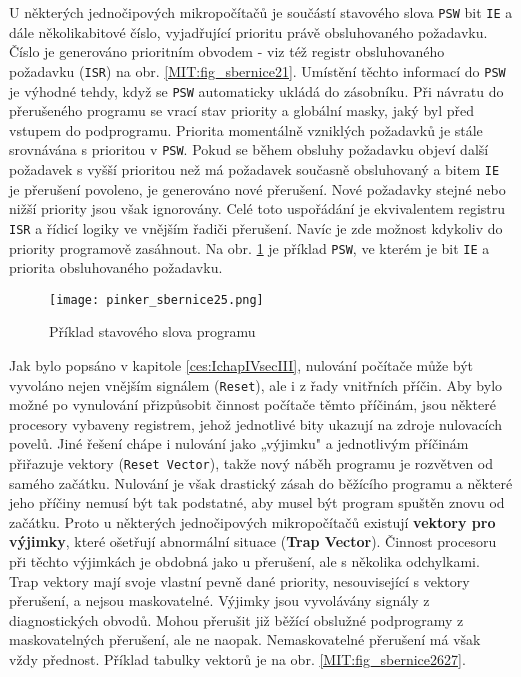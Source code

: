       U některých jednočipových mikropočítačů je součástí stavového slova \texttt{PSW} bit 
      \texttt{IE} a dále 	několikabitové číslo, vyjadřující prioritu právě obsluhovaného 
      požadavku. Číslo je generováno prioritním obvodem - viz též registr obsluhovaného požadavku 
      (\texttt{ISR}) na obr. \ref{MIT:fig_sbernice21}. Umístění těchto informací do \texttt{PSW} je 
      výhodné tehdy, když se \texttt{PSW} automaticky ukládá do zásobníku. Při návratu do 
      přerušeného programu se vrací stav priority a globální masky, jaký byl před vstupem do 
      podprogramu. Priorita momentálně vzniklých požadavků je stále srovnávána s prioritou v 
      \texttt{PSW}. Pokud se během obsluhy požadavku objeví další požadavek s vyšší prioritou než 
      má požadavek současně obsluhovaný a bitem \texttt{IE} je přerušení povoleno, je generováno 
      nové přerušení. Nové požadavky stejné nebo nižší priority jsou však ignorovány. Celé toto 
      uspořádání je ekvivalentem registru \texttt{ISR} a řídicí logiky ve vnějším řadiči přerušení. 
      Navíc je zde možnost kdykoliv do priority programově zasáhnout. Na obr. 
      \ref{MIT:fig_sbernice25} je příklad \texttt{PSW}, ve kterém je bit \texttt{IE} a priorita 
      obsluhovaného požadavku.
      
      \begin{figure}[ht!] %
        \centering
        \texttt{[image: pinker\_sbernice25.png]}
        \caption{Příklad stavového slova programu}
        \label{MIT:fig_sbernice25}
      \end{figure}
      
      Jak bylo popsáno v kapitole \ref{ces:IchapIVsecIII}, nulování počítače může být vyvoláno 
      nejen 
      vnějším signálem (\texttt{Reset}), ale i z řady vnitřních příčin. Aby bylo možné po 
      vynulování přizpůsobit činnost počítače těmto příčinám, jsou některé procesory vybaveny 
      registrem, jehož jednotlivé bity ukazují na zdroje nulovacích povelů. Jiné řešení chápe i 
      nulování jako „výjimku" a jednotlivým příčinám přiřazuje vektory (\texttt{Reset Vector}), 
      takže nový náběh programu je rozvětven od samého začátku. Nulování je však drastický zásah do 
      běžícího programu a některé jeho příčiny nemusí být tak podstatné, aby musel být program 
      spuštěn znovu od začátku. Proto u některých jednočipových mikropočítačů existují 
      \textbf{vektory pro výjimky}, které ošetřují abnormální situace (\textbf{Trap Vector}). 
      Činnost procesoru při těchto výjimkách je obdobná jako u přerušení, ale s několika 
      odchylkami. Trap vektory mají svoje vlastní pevně dané priority, nesouvisející s vektory 
      přerušení, a nejsou maskovatelné. Výjimky jsou vyvolávány signály z diagnostických obvodů. 
      Mohou přerušit již běžící obslužné podprogramy z maskovatelných přerušení, ale ne naopak. 
      Nemaskovatelné přerušení má však vždy přednost. Příklad tabulky vektorů je na obr. 
      \ref{MIT:fig_sbernice2627}.
      

